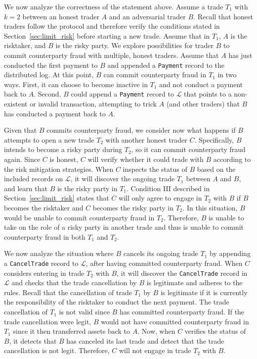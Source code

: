 We now analyze the correctness of the statement above.
Assume a trade $ T_1 $ with $ k = 2 $ between an honest trader $ A $ and an adversarial trader $ B $.
Recall that honest traders follow the \ModelName{} protocol and therefore verify the conditions stated in Section~\ref{sec:limit_risk} before starting a new trade.
Assume that in $ T_1 $, $ A $ is the risktaker, and $ B $ is the risky party.
We explore possibilities for trader $ B $ to commit counterparty fraud with multiple, honest traders.
Assume that $ A $ has just conducted the first payment to $ B $ and appended a \texttt{Payment} record to the distributed log.
At this point, $ B $ can commit counterparty fraud in $ T_1 $ in two ways.
First, it can choose to become inactive in $ T_1 $ and not conduct a payment back to $ A $.
Second, $ B $ could append a \texttt{Payment} record to $ \mathcal{L} $ that points to a non-existent or invalid transaction, attempting to trick $ A $ (and other traders) that $ B $ has conducted a payment back to $ A $.

Given that $ B $ commits counterparty fraud, we consider now what happens if $ B $ attempts to open a new trade $ T_2 $ with another honest trader $ C $.
Specifically, $ B $ intends to become a risky party during $ T_2 $, so it can commit counterparty fraud again.
Since $ C $ is honest, $ C $ will verify whether it could trade with $ B $ according to the \ModelName{} risk mitigation strategies.
When $ C $ inspects the status of $ B $ based on the included records on $ \mathcal{L} $, it will discover the ongoing trade $ T_1 $ between $ A $ and $ B $, and learn that $ B $ is the risky party in $ T_1 $.
Condition III described in Section~\ref{sec:limit_risk} states that $ C $ will only agree to engage in $ T_2 $ with $ B $ if $ B $ becomes the risktaker and $ C $ becomes the risky party in $ T_2 $.
In this situation, $ B $ would be unable to commit counterparty fraud in $ T_2 $.
Therefore, $ B $ is unable to take on the role of a risky party in another trade and thus is unable to commit counterparty fraud in both $ T_1 $ and $ T_2 $.

We now analyze the situation where $ B $ cancels its ongoing trade $ T_1 $ by appending a \texttt{CancelTrade} record to $ \mathcal{L} $, after having committed counterparty fraud.
When $ C $ considers entering in trade $ T_2 $ with $ B $, it will discover the \texttt{CancelTrade} record in $ \mathcal{L} $ and checks that the trade cancellation by $ B $ is legitimate and adheres to the rules.
Recall that the cancellation of trade $ T_1 $ by $ B $ is legitimate if it is currently the responsibility of the risktaker to conduct the next payment.
The trade cancellation of $ T_1 $ is not valid since $ B $ has committed counterparty fraud.
If the trade cancellation were legit, $ B $ would not have committed counterparty fraud in $ T_1 $ since it then transferred assets back to $ A $.
Now, when $ C $ verifies the status of $ B $, it detects that $ B $ has canceled its last trade and detect that the trade cancellation is not legit.
Therefore, $ C $ will not engage in trade $ T_2 $ with $ B $.

